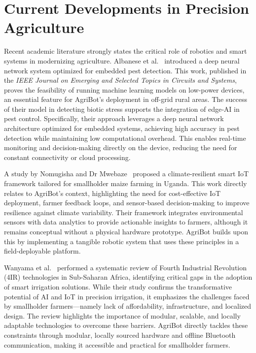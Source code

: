 \documentclass[12pt,a4paper]{report}
\begin{document}
\section{Current Developments in Precision Agriculture}
Recent academic literature strongly states the critical role of robotics and smart systems in modernizing agriculture. Albanese et al.~\cite{albanese2021automated} introduced a deep neural network system optimized for embedded pest detection. This work, published in the \textit{IEEE Journal on Emerging and Selected Topics in Circuits and Systems}, proves the feasibility of running machine learning models on low-power devices, an essential feature for AgriBot’s deployment in off-grid rural areas. The success of their model in detecting biotic stress supports the integration of edge‐AI in pest control. Specifically, their approach leverages a deep neural network architecture optimized for embedded systems, achieving high accuracy in pest detection while maintaining low computational overhead. This enables real-time monitoring and decision-making directly on the device, reducing the need for constant connectivity or cloud processing.

A study by Nomugisha and Dr Mwebaze~\cite{godwin2025smart} proposed a climate-resilient smart IoT framework tailored for smallholder maize farming in Uganda. This work directly relates to AgriBot’s context, highlighting the need for cost-effective IoT deployment, farmer feedback loops, and sensor-based decision-making to improve resilience against climate variability. Their framework integrates environmental sensors with data analytics to provide actionable insights to farmers, although it remains conceptual without a physical hardware prototype. AgriBot builds upon this by implementing a tangible robotic system that uses these principles in a field-deployable platform.

Wanyama et al.~\cite{wanyama2024systematic} performed a systematic review of Fourth Industrial Revolution (4IR) technologies in Sub-Saharan Africa, identifying critical gaps in the adoption of smart irrigation solutions. While their study confirms the transformative potential of AI and IoT in precision irrigation, it emphasizes the challenges faced by smallholder farmers—namely lack of affordability, infrastructure, and localized design. The review highlights the importance of modular, scalable, and locally adaptable technologies to overcome these barriers. AgriBot directly tackles these constraints through modular, locally sourced hardware and offline Bluetooth communication, making it accessible and practical for smallholder farmers.\\ \\ \\
\end{document}
